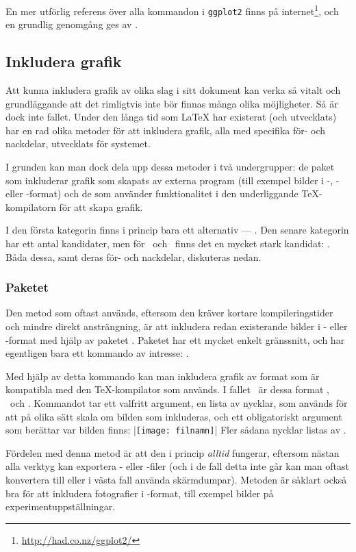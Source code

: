 \documentclass[lang=sv,ptsize=10pt,font=none,nomath,titles=bf,../../a4.tex]{subfiles}
\begin{document}
En mer utförlig referens över alla kommandon i \texttt{ggplot2} finns
på internet\footnote{\url{http://had.co.nz/ggplot2/}}, och en grundlig
genomgång ges av \textcite{Hadley09}.

\subsection{Inkludera grafik}
Att kunna inkludera grafik av olika slag i sitt dokument kan verka så
vitalt och grundläggande att det rimligtvis inte bör finnas många olika
möjligheter. Så är dock inte fallet. Under den långa tid som \LaTeX{} har
existerat (och utvecklats) har en rad olika metoder för att inkludera
grafik, alla med specifika för- och nackdelar, utvecklats för systemet.

I grunden kan man dock dela upp dessa metoder i två undergrupper: de
paket som inkluderar grafik som skapats av externa program (till
exempel bilder i \PDF-, \PNG- eller \JPEG-format) och de som använder
funktionalitet i den underliggande \TeX-kompilatorn för att skapa grafik.

I den första kategorin finns i princip bara ett alternativ
--- . Den senare kategorin har ett antal kandidater,
men för \pdfLaTeX\ och \XeTeX\ finns det en mycket stark kandidat:
\PGFTikZ. Båda dessa, samt deras för- och nackdelar, diskuteras nedan.

\subsubsection{Paketet }
Den metod som oftast används, eftersom den kräver kortare
kompileringstider och mindre direkt ansträngning, är att inkludera
redan existerande bilder i \PDF- eller \PNG-format med hjälp av
paketet . Paketet har ett mycket enkelt gränssnitt, och
har egentligen bara ett kommando av intresse: .

Med hjälp av detta kommando kan man inkludera grafik av format som är
kompatibla med den \TeX-kompilator som används. I fallet \pdfLaTeX\ är
dessa format \PNG, \PDF\ och \JPEG. Kommandot tar ett valfritt
argument, en lista av nycklar, som används för att på olika sätt
skala om bilden som inkluderas, och ett obligatoriskt argument som
berättar var bilden finns:
\latex|\texttt{[image: filnamn]}|
Fler sådana nycklar listas av \textcite[8\psq]{Carlisle05}.

Fördelen med denna metod är att den i princip \emph{alltid} fungerar,
eftersom nästan alla verktyg kan exportera \PNG- eller \PDF-filer (och
i de fall detta inte går kan man oftast konvertera till \PNG eller i
västa fall använda skärmdumpar). Metoden är såklart också bra för att
inkludera fotografier i \JPEG-format, till exempel bilder på
experimentuppställningar.
\end{document}
